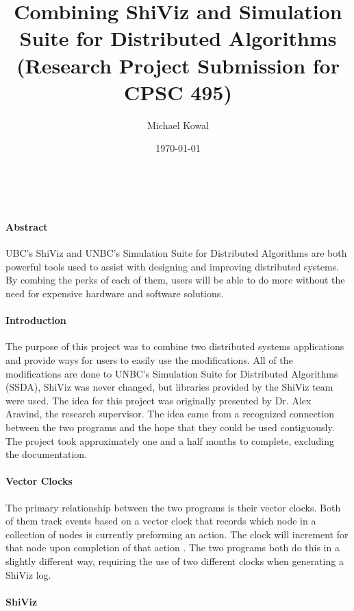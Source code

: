 \documentclass[12pt, oneside]{article}   	%
\title{Combining ShiViz and Simulation Suite for Distributed Algorithms (Research Project Submission for CPSC 495)}
\author{Michael Kowal}
\date{\today}
\begin{document}
\maketitle\ 
\paragraph{Abstract}

UBC's ShiViz and UNBC's Simulation Suite for Distributed Algorithms are both powerful tools used to assist with designing and improving distributed systems.  By combing the perks of each of them, users will be able to do more without the need for expensive hardware and software solutions.

\paragraph{Introduction}

The purpose of this project was to combine two distributed systems applications and provide ways for users to easily use the modifications.  All of the modifications are done to UNBC's Simulation Suite for Distributed Algorithms (SSDA), ShiViz was never changed, but libraries provided by the ShiViz team were used.  The idea for this project was originally presented by Dr. Alex Aravind, the research supervisor.  The idea came from a recognized connection between the two programs and the hope that they could be used contiguously. The project took approximately one and a half months to complete, excluding the documentation.  

\paragraph{Vector Clocks}

The primary relationship between the two programs is their vector clocks.  Both of them track events based on a vector clock that records which node in a collection of nodes is currently preforming an action.  The clock will increment for that node upon completion of that action \cite{VC1} \cite{VC2}.  The two programs both do this in a slightly different way, requiring the use of two different clocks when generating a ShiViz log.

\paragraph{ShiViz}
\end{document}

